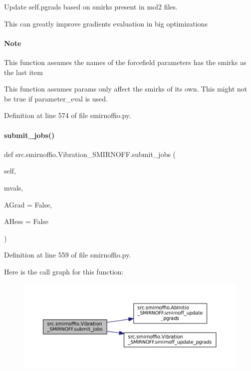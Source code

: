 Update self.\+pgrads based on smirks present in mol2 files. 

This can greatly improve gradients evaluation in big optimizations

\paragraph*{Note }


\begin{DoxyEnumerate}
\item This function assumes the names of the forcefield parameters has the smirks as the last item
\item This function assumes params only affect the smirks of its own. This might not be true if parameter\+\_\+eval is used. 
\end{DoxyEnumerate}

Definition at line 574 of file smirnoffio.\+py.

\mbox{\label{classsrc_1_1smirnoffio_1_1Vibration__SMIRNOFF_a6a03b295bc983ec7ab3c0896d5210669}} 
\paragraph{\texorpdfstring{submit\+\_\+jobs()}{submit\_jobs()}}
{\footnotesize\ttfamily def src.\+smirnoffio.\+Vibration\+\_\+\+S\+M\+I\+R\+N\+O\+F\+F.\+submit\+\_\+jobs (\begin{DoxyParamCaption}\item[{}]{self,  }\item[{}]{mvals,  }\item[{}]{A\+Grad = {\ttfamily False},  }\item[{}]{A\+Hess = {\ttfamily False} }\end{DoxyParamCaption})}



Definition at line 559 of file smirnoffio.\+py.

Here is the call graph for this function\+:
\nopagebreak
\begin{figure}[H]
\begin{center}
\leavevmode
\includegraphics[width=350pt]{classsrc_1_1smirnoffio_1_1Vibration__SMIRNOFF_a6a03b295bc983ec7ab3c0896d5210669_cgraph}
\end{center}
\end{figure}


